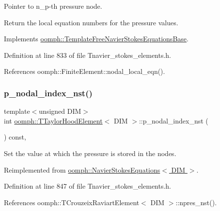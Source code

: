 Pointer to n\+\_\+p-\/th pressure node. 

Return the local equation numbers for the pressure values. 

Implements \hyperlink{classoomph_1_1TemplateFreeNavierStokesEquationsBase_a4e84f2f4260a0e65201cbb19fd63b398}{oomph\+::\+Template\+Free\+Navier\+Stokes\+Equations\+Base}.



Definition at line 833 of file Tnavier\+\_\+stokes\+\_\+elements.\+h.



References oomph\+::\+Finite\+Element\+::nodal\+\_\+local\+\_\+eqn().

\mbox{\label{classoomph_1_1TTaylorHoodElement_abbf584f29e53f15d5b0b263882138eac}} 
\subsubsection{\texorpdfstring{p\+\_\+nodal\+\_\+index\+\_\+nst()}{p\_nodal\_index\_nst()}}
{\footnotesize\ttfamily template$<$unsigned D\+IM$>$ \\
int \hyperlink{classoomph_1_1TTaylorHoodElement}{oomph\+::\+T\+Taylor\+Hood\+Element}$<$ D\+IM $>$\+::p\+\_\+nodal\+\_\+index\+\_\+nst (\begin{DoxyParamCaption}{ }\end{DoxyParamCaption}) const\hspace{0.3cm}{\ttfamily [inline]}, {\ttfamily [virtual]}}



Set the value at which the pressure is stored in the nodes. 



Reimplemented from \hyperlink{classoomph_1_1NavierStokesEquations_a3694d3e2f09259cfda71547259f031ed}{oomph\+::\+Navier\+Stokes\+Equations$<$ D\+I\+M $>$}.



Definition at line 847 of file Tnavier\+\_\+stokes\+\_\+elements.\+h.



References oomph\+::\+T\+Crouzeix\+Raviart\+Element$<$ D\+I\+M $>$\+::npres\+\_\+nst().

